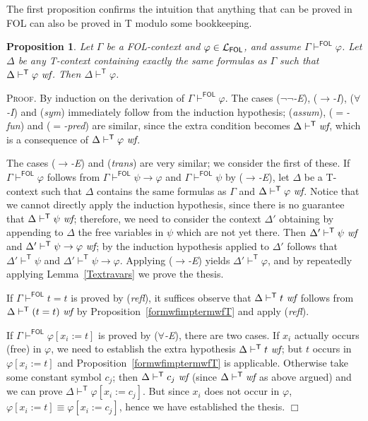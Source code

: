 \documentclass{article}
\newtheorem{proposition}[definition]{Proposition}
\newenvironment{proof}{\smallskip\textsc{Proof.}}{\hspace*{\fill}$\Box$}
\newcommand{\T}{\textsf T}
\newcommand{\FOL}{\textsf{FOL}}
\newcommand{\ok}{\mbox{\em wf}}
\newcommand{\wf}{\ \mbox{\em wf}}
\newcommand{\lang}[1]{\ensuremath{{\cal L}_{\mathsf{#1}}}}
\newcommand{\myvdash}[1]{\ensuremath{\vdash^{\mathsf{#1}}}}
\begin{document}
The first proposition confirms the intuition that anything that can be
proved in {\FOL} can also be proved in {\T} modulo some bookkeeping.
\begin{proposition}\label{FOLtoT} Let $\Gamma$ be a {\FOL}-context
and $\varphi\in\lang{FOL}$, and assume $\Gamma\myvdash{FOL}\varphi$.
Let $\Delta$ be any {\T}-context containing exactly the same formulas
as $\Gamma$ such that $\Delta\myvdash{T}\varphi\wf$.  Then
$\Delta\myvdash{T}\varphi$.
\end{proposition}
\begin{proof}
By induction on the derivation of
$\Gamma\myvdash{FOL}\varphi$.  The cases (\emph{$\neg\neg$-E}),
(\emph{$\to$-I}), (\emph{$\forall$-I}) and (\emph{sym}) immediately follow
from the induction hypothesis; (\emph{assum}), (\emph{$=$-fun}) and
(\emph{$=$-pred}) are similar, since the extra condition becomes
$\Delta\myvdash{T}\ok$, which is a consequence of
$\Delta\myvdash{T}\varphi\wf$.

The cases (\emph{$\to$-E}) and (\emph{trans}) are very similar; we consider
the first of these.  If $\Gamma\myvdash{FOL}\varphi$ follows
from $\Gamma\myvdash{FOL}\psi\to\varphi$ and $\Gamma\myvdash{FOL}\psi$
by (\emph{$\to$-E}), let $\Delta$ be a {\T}-context such that $\Delta$
contains the same formulas as $\Gamma$ and $\Delta\myvdash{T}\varphi\wf$.
Notice that we cannot directly apply the induction hypothesis, since
there is no guarantee that $\Delta\myvdash{T}\psi\wf$; therefore, we need
to consider the context $\Delta'$ obtaining by appending to $\Delta$ the free
variables in $\psi$ which are not yet there.
Then $\Delta'\myvdash{T}\psi\wf$ and $\Delta'\myvdash{T}\psi\to\varphi\wf$;
by the induction hypothesis applied to $\Delta'$ follows that
$\Delta'\myvdash{T}\psi$ and $\Delta'\myvdash{T}\psi\to\varphi$.  Applying
(\emph{$\to$-E}) yields $\Delta'\myvdash{T}\varphi$, and by repeatedly
applying Lemma~\ref{Textravars} we prove the thesis.

If $\Gamma\myvdash{FOL}t=t$ is proved by (\emph{refl}), it suffices
observe that $\Delta\myvdash{T}t\wf$ follows from
$\Delta\myvdash{T}(t=t)\wf$ by Proposition~\ref{formwfimptermwfT}
and apply (\emph{refl}).

If $\Gamma\myvdash{FOL}\varphi[x_i:=t]$ is proved by (\emph{$\forall$-E}),
there are two cases.  If $x_i$ actually occurs (free) in $\varphi$,
we need to establish the extra hypothesis $\Delta\myvdash{T}t\wf$;
but $t$ occurs in $\varphi[x_i:=t]$ and
Proposition~\ref{formwfimptermwfT} is applicable.  Otherwise take some
constant symbol $c_j$; then $\Delta\myvdash{T}c_j\wf$ (since
$\Delta\myvdash{T}\ok$ as above argued) and we can prove
$\Delta\myvdash{T}\varphi[x_i:=c_j]$.  But since $x_i$ does not
occur in $\varphi$, $\varphi[x_i:=t]\equiv\varphi[x_i:=c_j]$, hence we
have established the thesis.
\end{proof}
\end{document}
